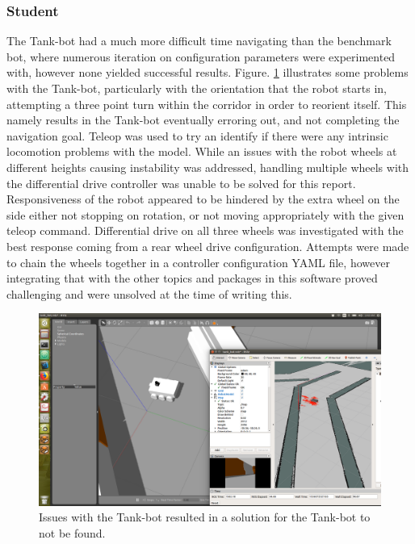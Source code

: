 \documentclass[10pt,journal,compsoc]{IEEEtran}
\begin{document}
\subsubsection{Student}\label{sec:student}

The Tank-bot had a much more difficult time navigating than the benchmark bot, where numerous iteration on configuration parameters were experimented with, however none yielded successful results. Figure. \ref{fig:tankbotissues} illustrates some problems with the Tank-bot, particularly with the orientation that the robot starts in, attempting a three point turn within the corridor in order to reorient itself. This namely results in the Tank-bot eventually erroring out, and not completing the navigation goal. Teleop was used to try an identify if there were any intrinsic locomotion problems with the model. While an issues with the robot wheels at different heights causing instability was addressed, handling multiple wheels with the differential drive controller was unable to be solved for this report. Responsiveness of the robot appeared to be hindered by the extra wheel on the side either not stopping on rotation, or not moving appropriately with the given teleop command. Differential drive on all three wheels was investigated with the best response coming from a rear wheel drive configuration. Attempts were made to chain the wheels together in a controller configuration YAML file, however integrating that with the other topics and packages in this software proved challenging and were unsolved at the time of writing this.


\begin{figure}[thpb]
    \centering
    \includegraphics[width=\linewidth]{../img/tank-bot-issues2.png}
    \caption{Issues with the Tank-bot resulted in a solution for the Tank-bot to not be found.}
    \label{fig:tankbotissues}
\end{figure}
\end{document}
